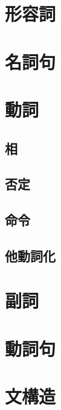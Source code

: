 \section{形容詞} %
\newpage

\section{名詞句}
\newpage

\section{動詞}
\subsection{相} %
\subsection{否定} %
\subsection{命令} %
\subsection{他動詞化} %
\newpage

\section{副詞}
\newpage

\section{動詞句}
\newpage

\section{文構造}

